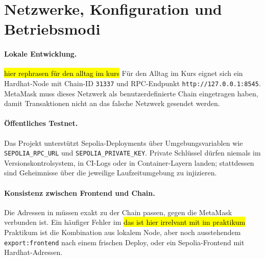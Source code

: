 \section{Netzwerke, Konfiguration und Betriebsmodi}

\paragraph{Lokale Entwicklung.}
\hl{hier rephrasen für den alltag im kurs}
Für den Alltag im Kurs eignet sich ein Hardhat-Node mit Chain-ID \texttt{31337}
und RPC-Endpunkt \texttt{http://127.0.0.1:8545}. MetaMask muss dieses Netzwerk
als benutzerdefinierte Chain eingetragen haben, damit Transaktionen nicht an das
falsche Netzwerk gesendet werden.

\paragraph{Öffentliches Testnet.}
Das Projekt unterstützt Sepolia-Deployments über Umgebungsvariablen wie
\texttt{SEPOLIA\_RPC\_URL} und \texttt{SEPOLIA\_PRIVATE\_KEY}. Private Schlüssel
dürfen niemals im Versionskontrolsystem, in CI-Logs oder in Container-Layern
landen; stattdessen sind Geheimnisse über die jeweilige Laufzeitumgebung zu
injizieren.

\paragraph{Konsistenz zwischen Frontend und Chain.}
Die Adressen in  müssen exakt zu der
Chain passen, gegen die MetaMask verbunden ist. Ein häufiger Fehler im \hl{das ist hier irrelvant mit im praktikum} Praktikum
ist die Kombination aus lokalem Node, aber noch ausstehendem
\texttt{export:frontend} nach einem frischen Deploy, oder ein Sepolia-Frontend mit
Hardhat-Adressen.
